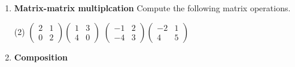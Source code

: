 \begin{enumerate}
Transform the following vectors by identifying the transformation matrix and compute the multiplication.
\begin{tasks}[after-skip = 80pt, after-item-skip = 80pt](2)
\task Reflect $\begin{pmatrix} 2 \\ 6 \end{pmatrix}$ across the x-axis.
\task Scale $\begin{pmatrix} 3 \\ -2 \end{pmatrix}$ by a factor of 4.
\task Rotate $\begin{pmatrix} 2 \\ -1 \end{pmatrix}$ clockwise by $180^\circ$.
\task Rotate $\begin{pmatrix} 4 \\ -5 \end{pmatrix}$ clockwise by $90^\circ$.
\task Rotate $\begin{pmatrix} -3 \\ 0 \end{pmatrix}$ counter-clockwise by $90^\circ$.
\task Rotate $\begin{pmatrix} 0 \\ 2 \end{pmatrix}$ counter-clockwise by $45^\circ$.
\end{tasks}

\newpage
\item \textbf{Matrix-matrix multiplcation} 
Compute the following matrix operations.
\begin{tasks}[after-skip = 100pt, after-item-skip = 100pt](2)
\task $\begin{pmatrix} 2 & 1 \\ 0 & 2 \end{pmatrix} \begin{pmatrix} 1 & 3 \\ 4 & 0 \end{pmatrix}$
\task $\begin{pmatrix} -1 & 2 \\ -4 & 3 \end{pmatrix} \begin{pmatrix} -2 & 1 \\ 4 & 5 \end{pmatrix}$
\end{tasks}
\item \textbf{Composition}


\end{enumerate}
